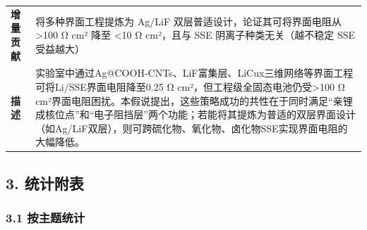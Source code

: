\documentclass[12pt,a4paper]{ctexart}
\begin{document}
{\begin{longtable}[]{@{}
  >{\raggedright\arraybackslash}p{}
  >{\raggedright\arraybackslash}p{}@{}}
\textbf{增量贡献} & 将多种界面工程提炼为 Ag/LiF 双层普适设计，论证其可将界面电阻从 \textgreater100 Ω cm² 降至 \textless10 Ω cm²，且与 SSE 阴离子种类无关（越不稳定 SSE 受益越大） \\
\textbf{描述} & 实验室中通过Ag@COOH-CNTs、LiF富集层、LiCux三维网络等界面工程可将Li/SSE界面电阻降至0.25 Ω cm²，但工程级全固态电池仍受\textgreater100 Ω cm²界面电阻困扰。本假说提出，这些策略成功的共性在于同时满足``亲锂成核位点''和``电子阻挡层''两个功能；若能将其提炼为普适的双层界面设计（如Ag/LiF双层），则可跨硫化物、氧化物、卤化物SSE实现界面电阻的大幅降低。 \\
\end{longtable}
}

\subsection{3. 统计附表}\label{ux7edfux8ba1ux9644ux8868}

\subsubsection{3.1 按主题统计}\label{ux6309ux4e3bux9898ux7edfux8ba1}
\end{document}
